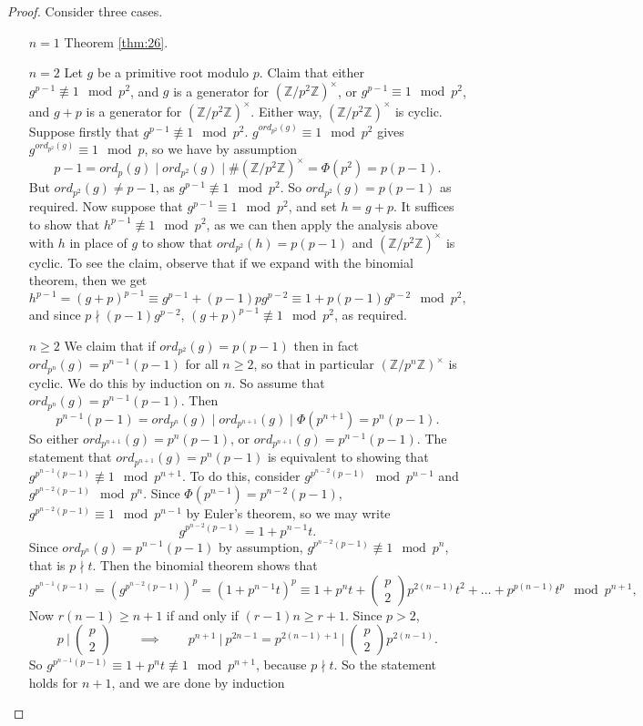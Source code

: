 \documentclass{article}
\newcommand{\Z}{\mathbb{Z}}
\newcommand{\rb}[1]{\left( #1 \right)}
\newcommand{\two}[2]{\begin{pmatrix} #1 \\ #2 \end{pmatrix}}
\newcommand{\unit}[1]{\rb{\Z / #1\Z}^\times}
\theoremstyle{definition}\newtheorem{definition}{Definition}
\theoremstyle{definition}\newtheorem*{remark}{Remark}
\theoremstyle{definition}\newtheorem*{example}{Example}
\theoremstyle{definition}\newtheorem*{note}{Note}
\begin{document}
\begin{proof}
Consider three cases.
\begin{itemize}
\item[$ n = 1 $] Theorem \ref{thm:26}.
\item[$ n = 2 $] Let $ g $ be a primitive root modulo $ p $. Claim that either $ g^{p - 1} \not\equiv 1 \mod p^2 $, and $ g $ is a generator for $ \unit{p^2} $, or $ g^{p - 1} \equiv 1 \mod p^2 $, and $ g + p $ is a generator for $ \unit{p^2} $. Either way, $ \unit{p^2} $ is cyclic. Suppose firstly that $ g^{p - 1} \not\equiv 1 \mod p^2 $. $ g^{ord_{p^2}\rb{g}} \equiv 1 \mod p^2 $ gives $ g^{ord_{p^2}\rb{g}} \equiv 1 \mod p $, so we have by assumption
$$ p - 1 = ord_p\rb{g} \mid ord_{p^2}\rb{g} \mid \#\unit{p^2} = \Phi\rb{p^2} = p\rb{p - 1}. $$
But $ ord_{p^2}\rb{g} \ne p - 1 $, as $ g^{p - 1} \not\equiv 1 \mod p^2 $. So $ ord_{p^2}\rb{g} = p\rb{p - 1} $ as required. Now suppose that $ g^{p - 1} \equiv 1 \mod p^2 $, and set $ h = g + p $. It suffices to show that $ h^{p - 1} \not\equiv 1 \mod p^2 $, as we can then apply the analysis above with $ h $ in place of $ g $ to show that $ ord_{p^2}\rb{h} = p\rb{p - 1} $ and $ \unit{p^2} $ is cyclic. To see the claim, observe that if we expand with the binomial theorem, then we get
$$ h^{p - 1} = \rb{g + p}^{p - 1} \equiv g^{p - 1} + \rb{p - 1}pg^{p - 2} \equiv 1 + p\rb{p - 1}g^{p - 2} \mod p^2, $$
and since $ p \nmid \rb{p - 1}g^{p - 2} $, $ \rb{g + p}^{p - 1} \not\equiv 1 \mod p^2 $, as required.
\item[$ n \ge 2 $] We claim that if $ ord_{p^2}\rb{g} = p\rb{p - 1} $ then in fact $ ord_{p^n}\rb{g} = p^{n - 1}\rb{p - 1} $ for all $ n \ge 2 $, so that in particular $ \unit{p^n} $ is cyclic. We do this by induction on $ n $. So assume that $ ord_{p^n}\rb{g} = p^{n - 1}\rb{p - 1} $. Then
$$ p^{n - 1}\rb{p - 1} = ord_{p^n}\rb{g} \mid ord_{p^{n + 1}}\rb{g} \mid \Phi\rb{p^{n + 1}} = p^n\rb{p - 1}. $$
So either $ ord_{p^{n + 1}}\rb{g} = p^n\rb{p - 1} $, or $ ord_{p^{n + 1}}\rb{g} = p^{n - 1}\rb{p - 1} $. The statement that $ ord_{p^{n + 1}}\rb{g} = p^n\rb{p - 1} $ is equivalent to showing that $ g^{p^{n - 1}\rb{p - 1}} \not\equiv 1 \mod p^{n + 1} $. To do this, consider $ g^{p^{n - 2}\rb{p - 1}} \mod p^{n - 1} $ and $ g^{p^{n - 2}\rb{p - 1}} \mod p^n $. Since $ \Phi\rb{p^{n - 1}} = p^{n - 2}\rb{p - 1} $, $ g^{p^{n - 2}\rb{p - 1}} \equiv 1 \mod p^{n - 1} $ by Euler's theorem, so we may write
$$ g^{p^{n - 2}\rb{p - 1}} = 1 + p^{n - 1}t. $$
Since $ ord_{p^n}\rb{g} = p^{n - 1}\rb{p - 1} $ by assumption, $ g^{p^{n - 2}\rb{p - 1}} \not\equiv 1 \mod p^n $, that is $ p \nmid t $. Then the binomial theorem shows that
$$ g^{p^{n - 1}\rb{p - 1}} = \rb{g^{p^{n - 2}\rb{p - 1}}}^p = \rb{1 + p^{n - 1}t}^p \equiv 1 + p^nt + \two{p}{2}p^{2\rb{n - 1}}t^2 + \dots + p^{p\rb{n - 1}}t^p \mod p^{n + 1}, $$
Now $ r\rb{n - 1} \ge n + 1 $ if and only if $ \rb{r - 1}n \ge r + 1 $. Since $ p > 2 $,
$$ p \ \Big| \ \two{p}{2} \qquad \implies \qquad p^{n + 1} \ \Big| \ p^{2n - 1} = p^{2\rb{n - 1} + 1} \ \Big| \ \two{p}{2}p^{2\rb{n - 1}}. $$
So $ g^{p^{n - 1}\rb{p - 1}} \equiv 1 + p^nt \not\equiv 1 \mod p^{n + 1} $, because $ p \nmid t $. So the statement holds for $ n + 1 $, and we are done by induction
\end{itemize}
\end{proof}
\end{document}
